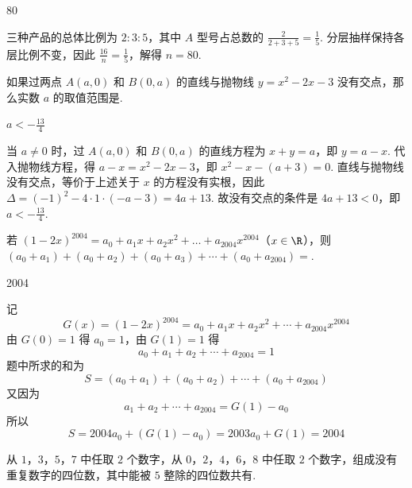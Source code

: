 \begin{answer}
80
\end{answer}

\begin{solution}
三种产品的总体比例为 \(2:3:5\)，其中 \(A\) 型号占总数的 \(\frac{2}{2+3+5}=\frac15\). 分层抽样保持各层比例不变，因此 \(\frac{16}{n}=\frac15\)，解得 \(n=80\).
\end{solution}

\begin{problem}
如果过两点 \(A(a,0)\) 和 \(B(0,a)\) 的直线与抛物线 \(y = x^{2} - 2x - 3\) 没有交点，那么实数 \(a\) 的取值范围是\fillinblank{}.
\end{problem}

\begin{answer}
\(a < -\frac{13}{4}\)
\end{answer}

\begin{solution}
当 \(a\ne0\) 时，过 \(A(a,0)\) 和 \(B(0,a)\) 的直线方程为
 \(x+y=a\)，即 \(y=a-x\). 代入抛物线方程，得 \(a-x=x^2-2x-3\)，即 \(x^2-x-(a+3)=0\).
直线与抛物线没有交点，等价于上述关于 \(x\) 的方程没有实根，因此 \(\Delta=(-1)^2-4\cdot1\cdot(-a-3)=4a+13\). 故没有交点的条件是 \(4a+13<0\)，即 \(a<-\frac{13}{4}\).
\end{solution}

\begin{problem}
若 \( (1-2x)^{2004}=a_{0}+a_{1}x+a_{2}x^{2}+\ldots+a_{2004}x^{2004}\)（\(x\in\R\)），则 \( (a_{0}+a_{1})+(a_{0}+a_{2})+(a_{0}+a_{3})+\cdots+(a_{0}+a_{2004})= \)\fillinblank{}.
\end{problem}

\begin{answer}
2004
\end{answer}

\begin{solution}
记
\[
G(x)=(1-2x)^{2004}=a_0+a_1x+a_2x^2+\cdots+a_{2004}x^{2004}
\]
由 \(G(0)=1\) 得 \(a_0=1\)，由 \(G(1)=1\) 得
\[
a_0+a_1+a_2+\cdots+a_{2004}=1
\]
题中所求的和为
\[
S=(a_0+a_1)+(a_0+a_2)+\cdots+(a_0+a_{2004})
\]
又因为
\[
a_1+a_2+\cdots+a_{2004}=G(1)-a_0
\]
所以
\[
S=2004a_0+(G(1)-a_0)=2003a_0+G(1)=2004
\]
\end{solution}

\begin{problem}
从 \(1\)，\(3\)，\(5\)，\(7\) 中任取 \(2\) 个数字，从 \(0\)，\(2\)，\(4\)，\(6\)，\(8\) 中任取 \(2\) 个数字，组成没有重复数字的四位数，其中能被 \(5\) 整除的四位数共有\fillinblank{}.
\end{problem}

